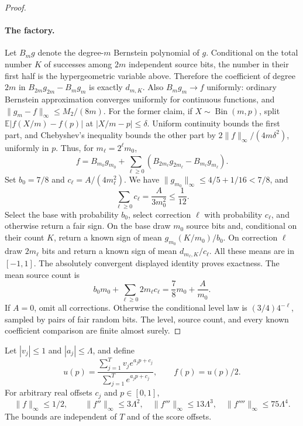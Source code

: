 \begin{proof}
\paragraph{The factory.}
Let $B_m g$ denote the degree-$m$ Bernstein polynomial of $g$.
Conditional on the total number $K$ of successes among $2m$
independent source bits, the number in their first half is the
hypergeometric variable above.  Therefore the coefficient of
degree $2m$ in $B_{2m}g_{2m}-B_mg_m$ is exactly $d_{m,K}$.
Also $B_mg_m\to f$ uniformly: ordinary Bernstein approximation
converges uniformly for continuous functions, and
$\|g_m-f\|_\infty\le M_2/(8m)$.
For the former claim, if $X\sim\operatorname{Bin}(m,p)$, split
$\mathbb E|f(X/m)-f(p)|$ at $|X/m-p|\le\delta$.
Uniform continuity bounds the first part, and Chebyshev's
inequality bounds the other part by
$2\|f\|_\infty/(4m\delta^2)$, uniformly in $p$.
Thus, for $m_\ell=2^\ell m_0$,
\[
 f=B_{m_0}g_{m_0}
   +\sum_{\ell\ge0}(B_{2m_\ell}g_{2m_\ell}-B_{m_\ell}g_{m_\ell}).
\]
Set $b_0=7/8$ and $c_\ell=A/(4m_\ell^2)$.
We have $\|g_{m_0}\|_\infty\le4/5+1/16<7/8$, and
\[
 \sum_{\ell\ge0}c_\ell=\frac{A}{3m_0^2}\le\frac1{12}.
\]
Select the base with probability $b_0$, select correction $\ell$
with probability $c_\ell$, and otherwise return a fair sign.
On the base draw $m_0$ source bits and, conditional on their count
$K$, return a known sign of mean $g_{m_0}(K/m_0)/b_0$.
On correction $\ell$ draw $2m_\ell$ bits and return a known sign
of mean $d_{m_\ell,K}/c_\ell$.
All these means are in $[-1,1]$.  The absolutely convergent
displayed identity proves exactness.  The mean source count is
\[
 b_0m_0+\sum_{\ell\ge0}2m_\ell c_\ell
 =\frac78m_0+\frac{A}{m_0}.
\]
If $A=0$, omit all corrections.  Otherwise the conditional level
law is $(3/4)4^{-\ell}$, sampled by pairs of fair random bits.
The level, source count, and every known coefficient comparison
are finite almost surely.
\end{proof}

\begin{lemma}
\label{lem:scalarsoftmaxderivatives}
Let $|v_j|\le1$ and $|a_j|\le\Lambda$, and define
\[
 u(p)=\frac{\sum_{j=1}^T v_j e^{a_jp+c_j}}
            {\sum_{j=1}^T e^{a_jp+c_j}},\qquad
 f(p)=u(p)/2.
\]
For arbitrary real offsets $c_j$ and $p\in[0,1]$,
\[
 \|f\|_\infty\le1/2,\qquad
 \|f''\|_\infty\le3\Lambda^2,\quad
 \|f'''\|_\infty\le13\Lambda^3,\quad
 \|f''''\|_\infty\le75\Lambda^4.
\]
The bounds are independent of $T$ and of the score offsets.
\end{lemma}

